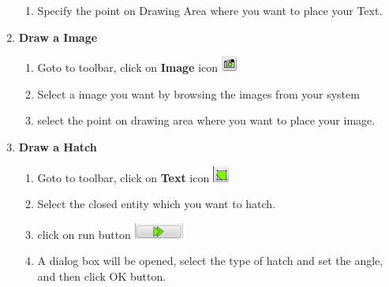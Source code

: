 \begin{enumerate}
{\begin{enumerate}
    \item{Specify the point on Drawing Area where you want to place your Text.}
    \end{enumerate}}
%
\vspace{.25in}
\item{\textbf{Draw a Image}\begin{enumerate}
    \item{Goto to toolbar, click on \textbf{Image} icon \includegraphics[width=20px]{./images/image.png}}
    \item{Select a image you want by browsing the images from your system}
    \item{select the point on drawing area where you want to place your image.}\end{enumerate}}
\vspace{.25in}
\item{\textbf{Draw a Hatch}\begin{enumerate}
    \item{Goto to toolbar, click on \textbf{Text} icon \includegraphics[width=20px]{./images/hatch.png}}
    \item{Select the closed entity which you want to hatch.}
    \item{ click on run button \includegraphics[height=20px]{./images/run.png}}
    \item{A dialog box will be opened, select the type of hatch and set the angle, and then click OK button.}
    \end{enumerate}}
\end{enumerate}
